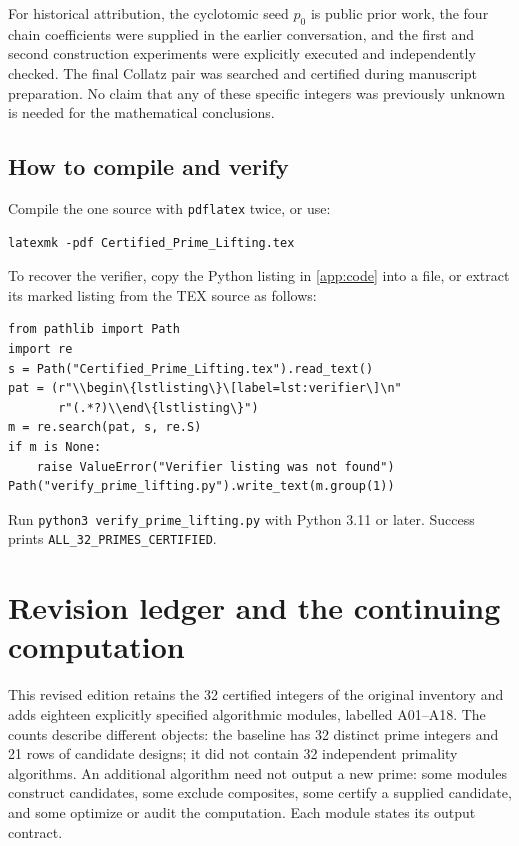 \documentclass[11pt,a4paper]{article}
\theoremstyle{definition}\newtheorem{definition}[theorem]{Definition}
\theoremstyle{remark}\newtheorem{remark}[theorem]{Remark}
\begin{document}
For historical attribution, the cyclotomic seed $p_0$ is public prior work,
the four chain coefficients were supplied in the earlier conversation, and
the first and second construction experiments were explicitly executed and
independently checked. The final Collatz pair was searched and certified
during manuscript preparation. No claim that any of these specific
integers was previously unknown is needed for the mathematical conclusions.

\subsection*{How to compile and verify}

Compile the one source with \texttt{pdflatex} twice, or use:
\begin{lstlisting}[language={}]
latexmk -pdf Certified_Prime_Lifting.tex
\end{lstlisting}
To recover the verifier,
copy the Python listing in \cref{app:code} into a file, or extract its marked
listing from the TEX source as follows:
\begin{lstlisting}
from pathlib import Path
import re
s = Path("Certified_Prime_Lifting.tex").read_text()
pat = (r"\\begin\{lstlisting\}\[label=lst:verifier\]\n"
       r"(.*?)\\end\{lstlisting\}")
m = re.search(pat, s, re.S)
if m is None:
    raise ValueError("Verifier listing was not found")
Path("verify_prime_lifting.py").write_text(m.group(1))
\end{lstlisting}
Run \texttt{python3 verify\_prime\_lifting.py} with Python 3.11 or later.
Success prints \texttt{ALL\_32\_PRIMES\_CERTIFIED}.

\clearpage
\section{Revision ledger and the continuing computation}
\label{sec:revision-ledger}

This revised edition retains the 32 certified integers of the original
inventory and adds eighteen explicitly specified algorithmic modules,
labelled A01--A18. The counts describe different objects: the baseline has
32 distinct prime integers and 21 rows of candidate designs; it did not
contain 32 independent primality algorithms. An additional algorithm need
not output a new prime: some modules construct candidates, some exclude
composites, some certify a supplied candidate, and some optimize or audit
the computation. Each module states its output contract.
\end{document}
